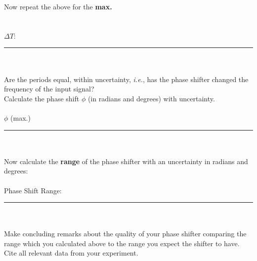 \noindent Now repeat the above for the {\bf max.} 
\ \\
\ \\
\ \\
$\Delta T$: \rule{3cm}{.1mm} \\ 
\ \\
\noindent Are the periods
equal, within uncertainty, {\it i.e.}, has the phase shifter changed the
frequency of the input signal? \\
\vfill
\pagebreak
\noindent Calculate the phase shift $\phi$ (in radians and degrees) with 
uncertainty.\\
\vspace*{3cm}\\
$\phi$ (max.) \rule{3cm}{.1mm} \\ 
\ \\
\noindent Now calculate the {\bf range} of the phase shifter with an uncertainty in radians and degrees: \\
\vspace*{1.5cm}\\
Phase Shift Range: \rule{3cm}{.1mm} \\
\ \\
\noindent Make concluding remarks about the quality of your phase shifter comparing the range which you calculated above to the range you expect the shifter to have. Cite all relevant data from your experiment.

\vfill
{}



\renewcommand{\thesection}{\thechapter.\arabic{section}}


















